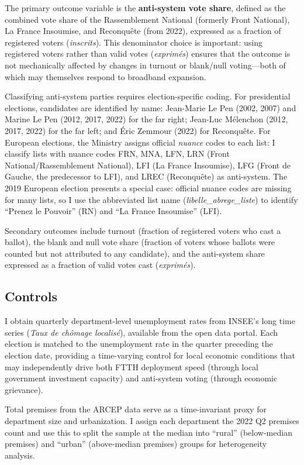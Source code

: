 \documentclass[12pt]{article}
\begin{document}
The primary outcome variable is the \textbf{anti-system vote share}, defined as the combined vote share of the Rassemblement National (formerly Front National), La France Insoumise, and Reconqu\^ete (from 2022), expressed as a fraction of registered voters (\emph{inscrits}). This denominator choice is important: using registered voters rather than valid votes (\emph{exprim\'es}) ensures that the outcome is not mechanically affected by changes in turnout or blank/null voting---both of which may themselves respond to broadband expansion.

Classifying anti-system parties requires election-specific coding. For presidential elections, candidates are identified by name: Jean-Marie Le Pen (2002, 2007) and Marine Le Pen (2012, 2017, 2022) for the far right; Jean-Luc M\'elenchon (2012, 2017, 2022) for the far left; and \'Eric Zemmour (2022) for Reconqu\^ete. For European elections, the Ministry assigns official \emph{nuance} codes to each list: I classify lists with nuance codes FRN, MNA, LFN, LRN (Front National/Rassemblement National), LFI (La France Insoumise), LFG (Front de Gauche, the predecessor to LFI), and LREC (Reconqu\^ete) as anti-system. The 2019 European election presents a special case: official nuance codes are missing for many lists, so I use the abbreviated list name (\emph{libelle\_abrege\_liste}) to identify ``Prenez le Pouvoir'' (RN) and ``La France Insoumise'' (LFI).

Secondary outcomes include turnout (fraction of registered voters who cast a ballot), the blank and null vote share (fraction of voters whose ballots were counted but not attributed to any candidate), and the anti-system share expressed as a fraction of valid votes cast (\emph{exprim\'es}).

\subsection{Controls}

I obtain quarterly department-level unemployment rates from INSEE's long time series (\emph{Taux de ch\^omage localis\'e}), available from the open data portal. Each election is matched to the unemployment rate in the quarter preceding the election date, providing a time-varying control for local economic conditions that may independently drive both FTTH deployment speed (through local government investment capacity) and anti-system voting (through economic grievance).

Total premises from the ARCEP data serve as a time-invariant proxy for department size and urbanization. I assign each department the 2022 Q2 premises count and use this to split the sample at the median into ``rural'' (below-median premises) and ``urban'' (above-median premises) groups for heterogeneity analysis.
\end{document}
